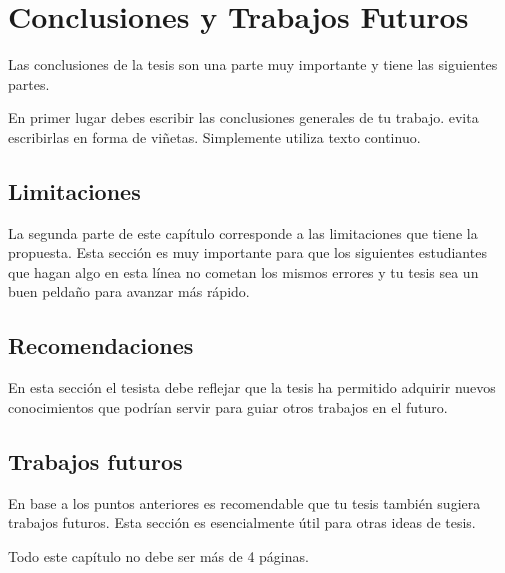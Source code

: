 \chapter{Conclusiones y Trabajos Futuros}\label{chap:conclusiones}
Las conclusiones de la tesis son una parte muy importante y tiene las siguientes partes.

En primer lugar debes escribir las conclusiones generales de tu trabajo. evita escribirlas en forma de viñetas. Simplemente utiliza texto continuo.

\section{Limitaciones}
La segunda  parte de este capítulo corresponde a las limitaciones que tiene la propuesta. Esta sección es muy importante para que los siguientes estudiantes que hagan algo en esta línea no cometan los mismos errores y tu tesis sea un buen peldaño para avanzar más rápido.

\section{Recomendaciones}
En esta sección el tesista debe reflejar que la tesis ha permitido adquirir nuevos conocimientos que podrían servir para guiar otros trabajos en el futuro.

\section{Trabajos futuros}
En base a los puntos anteriores es recomendable que tu tesis también sugiera trabajos futuros. Esta sección es esencialmente útil para otras ideas de tesis.

Todo este capítulo no debe ser más de 4 páginas.